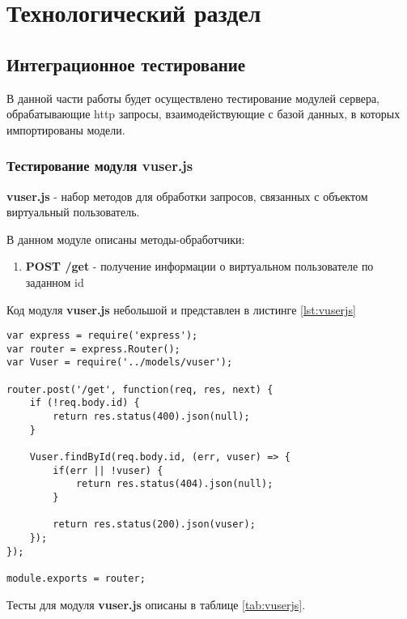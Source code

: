 \chapter{Технологический раздел}

\section{Интеграционное тестирование}

В данной части работы будет осуществлено тестирование модулей сервера, обрабатывающие http запросы, взаимодействующие с базой данных, в которых импортированы модели. 

\subsection{Тестирование модуля vuser.js}

\textbf{vuser.js} - набор методов для обработки запросов, связанных с объектом виртуальный пользователь.

В данном модуле описаны методы-обработчики:
\begin{enumerate}
	\item \textbf{POST /get} - получение информации о виртуальном пользователе по заданном id
\end{enumerate}

Код модуля \textbf{vuser.js} небольшой и представлен в листинге \ref{lst:vuserjs}

\begin{lstlisting}[caption={Код метода обработчика урла /get}, label={lst:vuserjs}]
var express = require('express');
var router = express.Router();
var Vuser = require('../models/vuser');

router.post('/get', function(req, res, next) {
    if (!req.body.id) {
        return res.status(400).json(null);
    }

    Vuser.findById(req.body.id, (err, vuser) => {
        if(err || !vuser) {
            return res.status(404).json(null);
        }

        return res.status(200).json(vuser);
    });
});

module.exports = router;
\end{lstlisting}

Тесты для модуля \textbf{vuser.js} описаны в таблице \ref{tab:vuserjs}.

